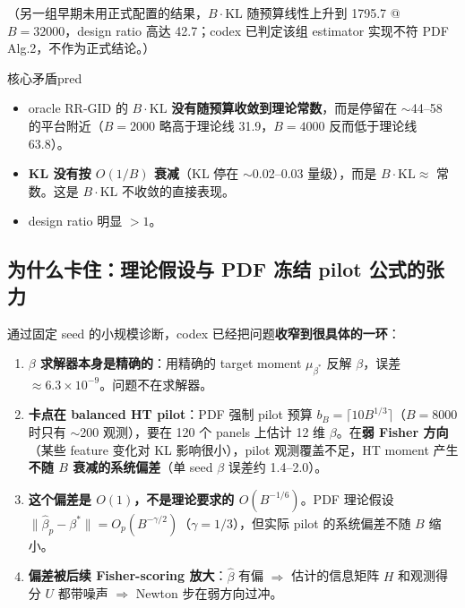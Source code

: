 \documentclass[11pt,a4paper]{ctexart}
\begin{document}
（另一组早期未用正式配置的结果，$B\cdot\mathrm{KL}$ 随预算线性上升到 1795.7 @ $B=32000$，design ratio 高达 42.7；codex 已判定该组 estimator 实现不符 PDF Alg.2，不作为正式结论。）

\begin{keybox}{核心矛盾}{pred}
\begin{itemize}
  \item oracle RR-GID 的 $B\cdot\mathrm{KL}$ \textbf{没有随预算收敛到理论常数}，而是停留在 $\sim$44--58 的平台附近（$B=2000$ 略高于理论线 31.9，$B=4000$ 反而低于理论线 63.8）。
  \item \textbf{KL 没有按 $O(1/B)$ 衰减}（KL 停在 $\sim$0.02--0.03 量级），而是 $B\cdot\mathrm{KL}\approx$ 常数。这是 $B\cdot\mathrm{KL}$ 不收敛的直接表现。
  \item design ratio 明显 $>1$。
\end{itemize}
\end{keybox}

\subsection{为什么卡住：理论假设与 PDF 冻结 pilot 公式的张力}
通过固定 seed 的小规模诊断，codex 已经把问题\textbf{收窄到很具体的一环}：
\begin{enumerate}
  \item \textbf{$\beta$ 求解器本身是精确的}：用精确的 target moment $\mu_{\beta^*}$ 反解 $\beta$，误差 $\approx 6.3\times10^{-9}$。问题不在求解器。
  \item \textbf{卡点在 balanced HT pilot}：PDF 强制 pilot 预算 $b_B=\lceil 10B^{1/3}\rceil$（$B=8000$ 时只有 $\sim$200 观测），要在 120 个 panels 上估计 12 维 $\beta$。在\textbf{弱 Fisher 方向}（某些 feature 变化对 KL 影响很小），pilot 观测覆盖不足，HT moment 产生\textbf{不随 $B$ 衰减的系统偏差}（单 seed $\beta$ 误差约 1.4--2.0）。
  \item \textbf{这个偏差是 $O(1)$，不是理论要求的 $O(B^{-1/6})$}。PDF 理论假设 $\lVert\hat\beta_p-\beta^*\rVert = O_p(B^{-\gamma/2})$（$\gamma=1/3$），但实际 pilot 的系统偏差不随 $B$ 缩小。
  \item \textbf{偏差被后续 Fisher-scoring 放大}：$\hat\beta$ 有偏 $\Rightarrow$ 估计的信息矩阵 $H$ 和观测得分 $U$ 都带噪声 $\Rightarrow$ Newton 步在弱方向过冲。
\end{enumerate}
\end{document}
